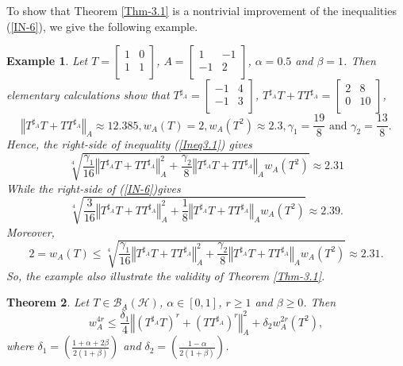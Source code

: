 \documentclass{article}
\newcommand{\bra}[1]{\left(#1\right)}
\newcommand{\normA}[1]{{\left\Vert#1\right\Vert}_{A}}
\newcommand {\h}{\mathcal{H}}
\newcommand {\Ta}{T^{\sharp_{A}}}
\renewcommand {\b}{\mathcal{B}}
\newtheorem{theorem}{Theorem}[section]
\newtheorem{example}[theorem]{Example}
\begin{document}
To show that Theorem \ref{Thm-3.1} is a nontrivial improvement of the inequalities  (\ref{IN-6}), we give the following example.
\begin{example} Let $T=\begin{bmatrix} 1& 0 \\ 1 & 1 \\ \end{bmatrix}$, $A=\begin{bmatrix} 1 & -1 \\ -1 & 2 \\ \end{bmatrix}$,
$\alpha=0.5$ and $\beta=1$. Then elementary calculations show that
$\Ta=\begin{bmatrix} -1& 4 \\  -1&  3\\ \end{bmatrix}$, $\Ta T+T\Ta=\begin{bmatrix} 2& 8 \\  0&  10\\ \end{bmatrix}$,
$$\normA{\Ta T+T\Ta}\approx 12.385, w_A(T)=2, w_A(T^2)\approx 2.3, \gamma_1=\frac{19}{8}\,\,\mbox{and}\,\, \gamma_2=\frac{13}{8}.$$
Hence, the right-side of inequality (\ref{Ineq3.1}) gives
$$\sqrt[4]{\frac{\gamma_1}{16}\normA{\Ta T+T\Ta}^2+ \frac{\gamma_2}{8}\normA{\Ta T+T\Ta}w_A(T^2)}\approx 2.31$$
While the right-side of  (\ref{IN-6})gives
$$\sqrt[4]{\frac{3}{16}\normA{\Ta T+T\Ta}^2+\frac{1}{8}\normA{\Ta T+T\Ta}w_A(T^2)}\approx 2.39.$$
Moreover,
$$2=w_A(T)\leq \sqrt[4]{\frac{\gamma_1}{16}\normA{\Ta T+T\Ta}^2+ \frac{\gamma_2}{8}\normA{\Ta T+T\Ta}w_A(T^2)}\approx 2.31.$$
So, the example also illustrate the validity of Theorem \ref{Thm-3.1}.
\end{example}
\begin{theorem}\label{Thm3.2} Let $T\in\b_A(\h)$, $\alpha\in[0,1]$, $r\geq 1$ and $\beta\geq 0$. Then
\begin{equation}\label{Ineq3.2}
  w_A^{4r}\leq \frac{\delta_1}{4}\normA{\bra{\Ta T}^{r}+\bra{T\Ta}^{r}}^2+\delta_2w_A^{2r}(T^2),
\end{equation}
where $\delta_1=\bra{\frac{1+\alpha+2\beta}{2(1+\beta)}}$ and $\delta_2=\bra{\frac{1-\alpha}{2(1+\beta)}}$.
\end{theorem}
\end{document}
